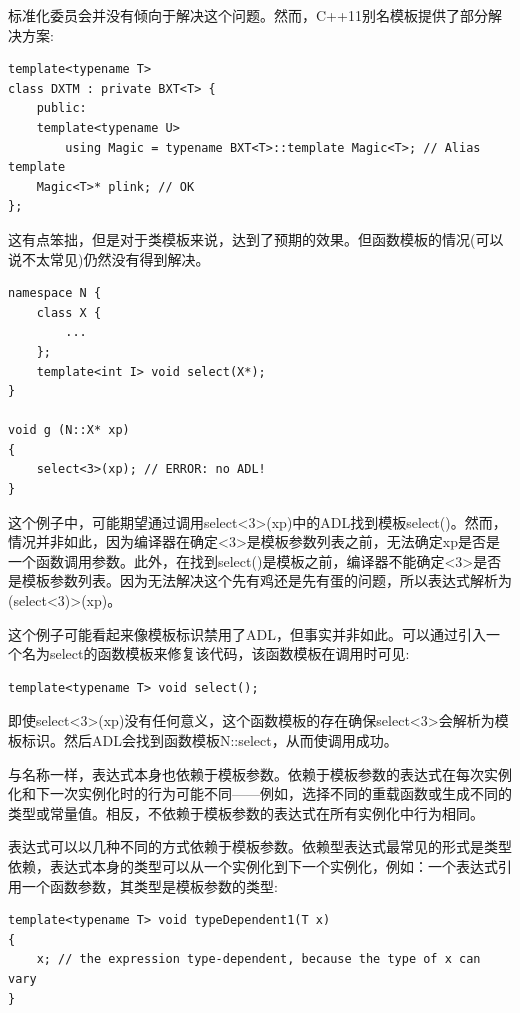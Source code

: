 标准化委员会并没有倾向于解决这个问题。然而，C++11别名模板提供了部分解决方案:

\begin{lstlisting}[style=styleCXX]
template<typename T>
class DXTM : private BXT<T> {
	public:
	template<typename U>
		using Magic = typename BXT<T>::template Magic<T>; // Alias template
	Magic<T>* plink; // OK
};
\end{lstlisting}

这有点笨拙，但是对于类模板来说，达到了预期的效果。但函数模板的情况(可以说不太常见)仍然没有得到解决。


\begin{lstlisting}[style=styleCXX]
namespace N {
	class X {
		...
	};
	template<int I> void select(X*);
}

void g (N::X* xp)
{
	select<3>(xp); // ERROR: no ADL!
}
\end{lstlisting}

这个例子中，可能期望通过调用select<3>(xp)中的ADL找到模板select()。然而，情况并非如此，因为编译器在确定<3>是模板参数列表之前，无法确定xp是否是一个函数调用参数。此外，在找到select()是模板之前，编译器不能确定<3>是否是模板参数列表。因为无法解决这个先有鸡还是先有蛋的问题，所以表达式解析为(select<3)>(xp)。

这个例子可能看起来像模板标识禁用了ADL，但事实并非如此。可以通过引入一个名为select的函数模板来修复该代码，该函数模板在调用时可见:

\begin{lstlisting}[style=styleCXX]
template<typename T> void select();
\end{lstlisting}

即使select<3>(xp)没有任何意义，这个函数模板的存在确保select<3>会解析为模板标识。然后ADL会找到函数模板N::select，从而使调用成功。


与名称一样，表达式本身也依赖于模板参数。依赖于模板参数的表达式在每次实例化和下一次实例化时的行为可能不同——例如，选择不同的重载函数或生成不同的类型或常量值。相反，不依赖于模板参数的表达式在所有实例化中行为相同。

表达式可以以几种不同的方式依赖于模板参数。依赖型表达式最常见的形式是类型依赖，表达式本身的类型可以从一个实例化到下一个实例化，例如：一个表达式引用一个函数参数，其类型是模板参数的类型:

\begin{lstlisting}[style=styleCXX]
template<typename T> void typeDependent1(T x)
{
	x; // the expression type-dependent, because the type of x can vary
}
\end{lstlisting}

